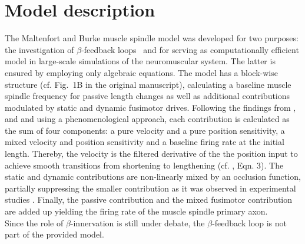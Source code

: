 \documentclass[fleqn,10pt]{physiome}
\begin{document}



\section{Model description}
The Maltenfort and Burke muscle spindle model was developed for two purposes: the investigation  of $\beta$-feedback loops~\citep{burke1977} and for serving as computationally efficient model in large-scale simulations of the neuromuscular system.  
The latter is ensured by employing only algebraic equations. 
The model has a block-wise structure (cf. Fig.~1B in the original manuscript), calculating a baseline muscle spindle frequency for passive length changes as well as additional contributions modulated by static and dynamic fusimotor drives. Following the findings from \citet{andersson1968}, \citet{lennerstrand1968b,lennerstrand1968c} and \citet{lennerstrand1968a} and using a phenomenological approach, each contribution is calculated as the sum of four components: a pure velocity and a pure position sensitivity, a mixed velocity and position sensitivity and a baseline firing rate at the initial length.
Thereby, the velocity is the filtered derivative of the the position input to achieve smooth transitions from shortening to lengthening (cf. \citet{maltenfort2003}, Eqn. 3).  
The static and dynamic contributions are non-linearly mixed by an occlusion function, partially suppressing the smaller contribution as it was observed in experimental studies \citep{schafer1974}.
Finally, the passive contribution and the mixed fusimotor contribution are added up yielding the firing rate of the muscle spindle primary axon. \\
Since the role of $\beta$-innervation is still under debate, the $\beta$-feedback loop is not part of the provided model.  
\end{document}
